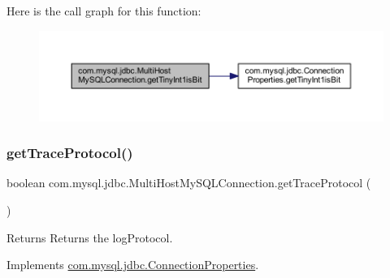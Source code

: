 Here is the call graph for this function\+:
\nopagebreak
\begin{figure}[H]
\begin{center}
\leavevmode
\includegraphics[width=350pt]{classcom_1_1mysql_1_1jdbc_1_1_multi_host_my_s_q_l_connection_a94faebe8a08ecfceb521766576703f02_cgraph}
\end{center}
\end{figure}
\mbox{\label{classcom_1_1mysql_1_1jdbc_1_1_multi_host_my_s_q_l_connection_ac04f24be8ad62148eb1ea1718ea42851}} 
\subsubsection{\texorpdfstring{get\+Trace\+Protocol()}{getTraceProtocol()}}
{\footnotesize\ttfamily boolean com.\+mysql.\+jdbc.\+Multi\+Host\+My\+S\+Q\+L\+Connection.\+get\+Trace\+Protocol (\begin{DoxyParamCaption}{ }\end{DoxyParamCaption})}

\begin{DoxyReturn}{Returns}
Returns the log\+Protocol. 
\end{DoxyReturn}


Implements \mbox{\hyperlink{interfacecom_1_1mysql_1_1jdbc_1_1_connection_properties_ac91e629cc7505335e1de76be5d070102}{com.\+mysql.\+jdbc.\+Connection\+Properties}}.


